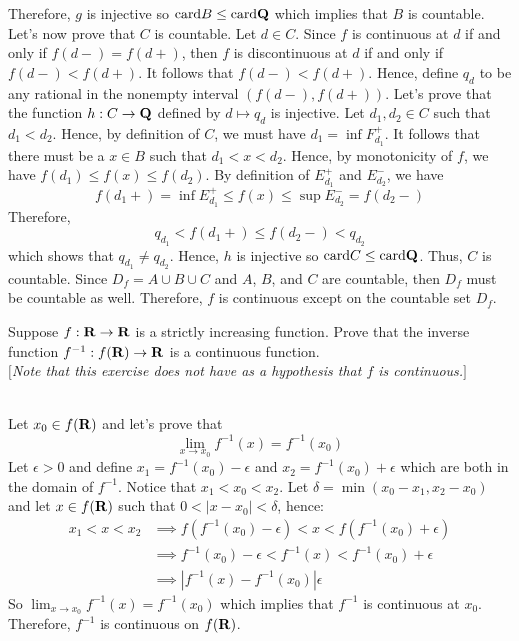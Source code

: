 \begin{solution}
    Therefore, $g$ is injective so $\text{card} B \leq \text{card} \mathbf{Q}$ which implies that $B$ is countable.\\
    Let's now prove that $C$ is countable. Let $d \in C$. Since $f$ is continuous at $d$ if and only if $f(d-) = f(d+)$, then $f$ is discontinuous at $d$ if and only if $f(d-) < f(d+)$. It follows that $f(d-) < f(d+)$. Hence, define $q_d$ to be any rational in the nonempty interval $(f(d-), f(d+))$. Let's prove that the function $h : C \to \mathbf{Q}$ defined by $d \mapsto q_d$ is injective. Let $d_1, d_2 \in C$ such that $d_1 < d_2$. Hence, by definition of $C$, we must have $d_1 = \inf F_{d_1}^+$. It follows that there must be a $x \in B$ such that $d_1 < x < d_2$. Hence, by monotonicity of $f$, we have $f(d_1) \leq f(x) \leq f(d_2)$. By definition of $E_{d_1}^+$ and $E_{d_2}^-$, we have
    $$f(d_1+) = \inf E_{d_1}^+ \leq f(x) \leq \sup E_{d_2}^- = f(d_2-)$$
    Therefore, 
    $$q_{d_1} < f(d_1+) \leq f(d_2-) < q_{d_2}$$
    which shows that $q_{d_1} \neq q_{d_2}$. Hence, $h$ is injective so $\text{card} C \leq \text{card} \mathbf{Q}$. Thus, $C$ is countable. Since $D_f = A \cup B \cup C$ and $A$, $B$, and $C$ are countable, then $D_f$ must be countable as well. Therefore, $f$ is continuous except on the countable set $D_f$.\\
\end{solution}

\begin{exercise}
    Suppose $f : \mathbf{R} \to \mathbf{R}$ is a strictly increasing function. Prove that the inverse function $f^{-1} : f(\mathbf{R}) \to \mathbf{R}$ is a continuous function. \\
    $[$\textit{Note that this exercise does not have as a hypothesis that $f$ is continuous.}$]$\\
\end{exercise}

\begin{solution}
    \\ Let $x_0 \in f(\mathbf{R})$ and let's prove that
    $$\lim_{x \rightarrow x_0}f^{-1}(x) = f^{-1}(x_0)$$
    Let $\epsilon > 0$ and define $x_1 = f^{-1}(x_0) - \epsilon$ and $x_2 = f^{-1}(x_0) + \epsilon$ which are both in the domain of $f^{-1}$. Notice that $x_1 < x_0 < x_2$. Let $\delta = \min(x_0 - x_1, x_2 - x_0)$ and let $x \in f(\mathbf{R})$ such that $0 < |x - x_0| < \delta$, hence:
    \begin{align*}
        x_1 < x < x_2 &\implies f(f^{-1}(x_0) - \epsilon) < x < f(f^{-1}(x_0) + \epsilon) \\
        &\implies f^{-1}(x_0) - \epsilon < f^{-1}(x) < f^{-1}(x_0) + \epsilon \\
        &\implies |f^{-1}(x) - f^{-1}(x_0)| \epsilon
    \end{align*}
    So $\lim_{x \rightarrow x_0}f^{-1}(x) = f^{-1}(x_0)$ which implies that $f^{-1}$ is continuous at $x_0$. Therefore, $f^{-1}$ is continuous on $f(\mathbf{R})$.\\
\end{solution}

